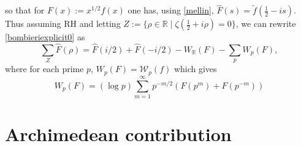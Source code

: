 \documentclass[reqno,12pt]{amsart}
\def\R{{\mathbb R}}
\begin{document}
 so that for $F(x):=x^{1/2}f(x)$ one has, using \eqref{mellin}, ${\widehat F}(s)=\tilde f(\frac 12-is)$. Thus assuming RH and letting $Z:=\{\rho\in \R\mid \zeta(\frac 12+i\rho)=0\}$, we can rewrite \eqref{bombieriexplicit0} as 
 \begin{equation}\label{explicit0}
 \sum_Z {\widehat F}(\rho)= {\widehat F}(i/2)+{\widehat F}(-i/2)- W_\R(F)-\sum_p W_p(F), 
 \end{equation}
 where for each prime $p$, $W_p(F)={\mathcal W}_p(f)$ which gives
 \begin{equation}\label{eachp}
 W_p(F)= (\log p)\sum_{m=1}^\infty p^{-m/2}\left(F(p^m)+F(p^{-m})\right)
 \end{equation}
\section{Archimedean contribution}\label{archimedean}
\end{document}
